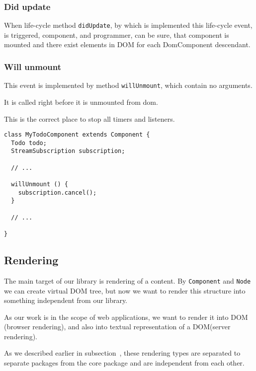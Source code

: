\documentclass[oneside, 12pt]{book}
\begin{document}
    \subsubsection{Did update}\label{subsec:our-architecture-lifecycle-didupdate}

      When life-cycle method \texttt{didUpdate}, 
      by which is implemented this life-cycle event, 
      is triggered, component, and programmer, can be sure, 
      that component is mounted and there exist elements in DOM for each DomComponent descendant.

    \subsubsection{Will unmount}\label{subsec:our-architecture-lifecycle-willunmount}

      This event is implemented by method \texttt{willUnmount}, which contain no arguments.
      
      It is called right before it is unmounted from dom. 

      This is the correct place to stop all timers and listeners.
      \begin{verbatim}
class MyTodoComponent extends Component {
  Todo todo;
  StreamSubscription subscription;

  // ...

  willUnmount () {
    subscription.cancel();
  }

  // ...

}
      \end{verbatim}



  \subsection{Rendering}\label{subsec:our-architecture-rendering}
    The main target of our library is rendering of a content. 
    By \texttt{Component} and \texttt{Node} we can create virtual DOM tree, 
    but now we want to render this structure into something independent from our library. 

    As our work is in the scope of web applications, we want to render it into DOM (browser rendering), 
    and also into textual representation of a DOM(server rendering).

    As we described earlier in subsection~, 
    these rendering types are separated to separate packages from the core package and are independent from each other. 
\end{document}
